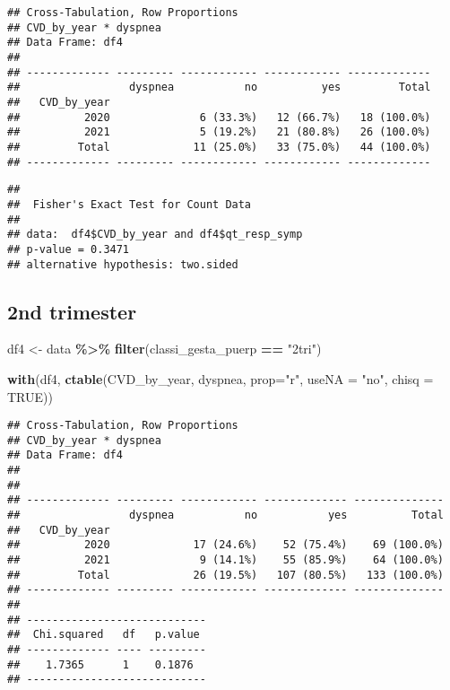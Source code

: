 \documentclass[
]{article}
\newenvironment{Shaded}{\begin{snugshade}}{\end{snugshade}}
\newcommand{\AttributeTok}[1]{\textcolor[rgb]{0.13,0.29,0.53}{#1}}
\newcommand{\ConstantTok}[1]{\textcolor[rgb]{0.56,0.35,0.01}{#1}}
\newcommand{\FunctionTok}[1]{\textcolor[rgb]{0.13,0.29,0.53}{\textbf{#1}}}
\newcommand{\NormalTok}[1]{#1}
\newcommand{\OtherTok}[1]{\textcolor[rgb]{0.56,0.35,0.01}{#1}}
\newcommand{\SpecialCharTok}[1]{\textcolor[rgb]{0.81,0.36,0.00}{\textbf{#1}}}
\newcommand{\StringTok}[1]{\textcolor[rgb]{0.31,0.60,0.02}{#1}}
\begin{document}
\begin{verbatim}
## Cross-Tabulation, Row Proportions  
## CVD_by_year * dyspnea  
## Data Frame: df4  
## 
## ------------- --------- ------------ ------------ -------------
##                 dyspnea           no          yes         Total
##   CVD_by_year                                                  
##          2020              6 (33.3%)   12 (66.7%)   18 (100.0%)
##          2021              5 (19.2%)   21 (80.8%)   26 (100.0%)
##         Total             11 (25.0%)   33 (75.0%)   44 (100.0%)
## ------------- --------- ------------ ------------ -------------
\end{verbatim}

\begin{Shaded}
\end{Shaded}

\begin{verbatim}
## 
##  Fisher's Exact Test for Count Data
## 
## data:  df4$CVD_by_year and df4$qt_resp_symp
## p-value = 0.3471
## alternative hypothesis: two.sided
\end{verbatim}

\hypertarget{nd-trimester}{%
\subsection{2nd trimester}\label{nd-trimester}}

\begin{Shaded}
\begin{Highlighting}[]
\NormalTok{df4 }\OtherTok{\textless{}{-}}\NormalTok{ data }\SpecialCharTok{\%\textgreater{}\%} 
  \FunctionTok{filter}\NormalTok{(classi\_gesta\_puerp }\SpecialCharTok{==} \StringTok{"2tri"}\NormalTok{)}

\FunctionTok{with}\NormalTok{(df4, }\FunctionTok{ctable}\NormalTok{(CVD\_by\_year, dyspnea, }\AttributeTok{prop=}\StringTok{"r"}\NormalTok{, }\AttributeTok{useNA =} \StringTok{"no"}\NormalTok{, }\AttributeTok{chisq =} \ConstantTok{TRUE}\NormalTok{))}
\end{Highlighting}
\end{Shaded}

\begin{verbatim}
## Cross-Tabulation, Row Proportions  
## CVD_by_year * dyspnea  
## Data Frame: df4  
## 
## 
## ------------- --------- ------------ ------------- --------------
##                 dyspnea           no           yes          Total
##   CVD_by_year                                                    
##          2020             17 (24.6%)    52 (75.4%)    69 (100.0%)
##          2021              9 (14.1%)    55 (85.9%)    64 (100.0%)
##         Total             26 (19.5%)   107 (80.5%)   133 (100.0%)
## ------------- --------- ------------ ------------- --------------
## 
## ----------------------------
##  Chi.squared   df   p.value 
## ------------- ---- ---------
##    1.7365      1    0.1876  
## ----------------------------
\end{verbatim}
\end{document}
